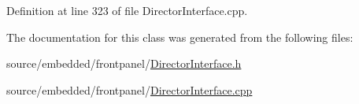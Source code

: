 Definition at line 323 of file Director\-Interface.\-cpp.



The documentation for this class was generated from the following files\-:\begin{DoxyCompactItemize}
\item 
source/embedded/frontpanel/\hyperlink{_director_interface_8h}{Director\-Interface.\-h}\item 
source/embedded/frontpanel/\hyperlink{_director_interface_8cpp}{Director\-Interface.\-cpp}\end{DoxyCompactItemize}
